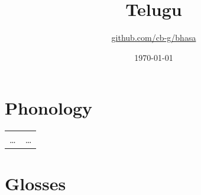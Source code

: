 \documentclass{article}
\title{Telugu\\\ipa{["telugu]}}
\author{\href{https://github.com/cb-g/bhasa}{github.com/cb-g/bhasa}}
\date{\today}
\begin{document}
\pagecolor{custom_bg}\color{custom_fg}
\maketitle\thispagestyle{empty}

\newpage\setcounter{page}{1}\section{Phonology}

\begin{table}[H]
  \color{custom_fg}
  \begin{tabular}{ll}
    \dots & \dots \\
  \end{tabular}
\end{table}

\newpage\section{Glosses}
\end{document}
